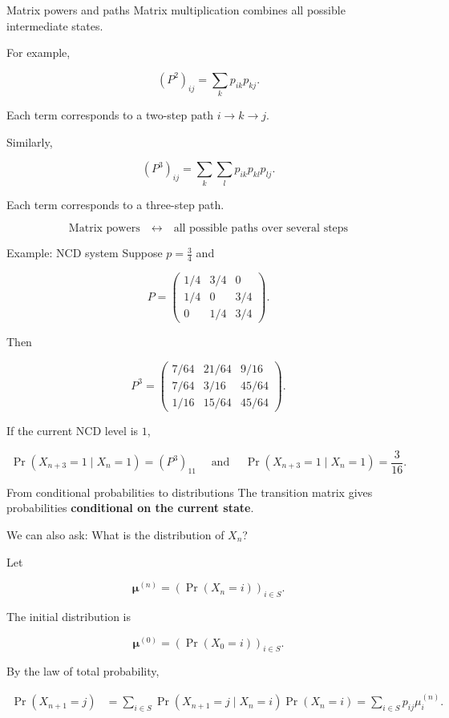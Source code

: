 \documentclass[
  ignorenonframetext,
  aspectratio=169,
]{beamer}
\begin{document}
\begin{frame}{Matrix powers and paths}
\protect{}\label{matrix-powers-and-paths}
Matrix multiplication combines all possible intermediate states.

For example,

\[
(P^2)_{ij}
=\sum_k p_{ik}p_{kj}.
\]

Each term corresponds to a two-step path
\(i\longrightarrow k\longrightarrow j.\)

Similarly,

\[
(P^3)_{ij}
=\sum_{k}\sum_l
p_{ik}p_{kl}p_{lj}.
\]

Each term corresponds to a three-step path.

\[
\boxed{
\text{Matrix powers}
\quad\longleftrightarrow\quad
\text{all possible paths over several steps}
}
\]
\end{frame}

\begin{frame}{Example: NCD system}
\protect{}\label{example-ncd-system-1}
Suppose \(p=\frac34\) and

\[
P=
\begin{pmatrix}
1/4&3/4&0\\
1/4&0&3/4\\
0&1/4&3/4
\end{pmatrix}.
\]

Then

\[
P^3=
\begin{pmatrix}
7/64&21/64&9/16\\
7/64&3/16&45/64\\
1/16&15/64&45/64
\end{pmatrix}.
\]

If the current NCD level is \(1\),

\[
\Pr(X_{n+3}=1\mid X_n=1)
=(P^3)_{11} \quad \text{ and } \quad \boxed{
\Pr(X_{n+3}=1\mid X_n=1)
=\frac{3}{16}.
}
\]
\end{frame}

\begin{frame}{From conditional probabilities to distributions}
\protect{}\label{from-conditional-probabilities-to-distributions}
The transition matrix gives probabilities \textbf{conditional on the
current state}.

We can also ask: What is the distribution of \(X_n\)?

Let

\[
\boldsymbol{\mu}^{(n)}
=\left(
\Pr(X_n=i)
\right)_{i\in S}.
\]

The initial distribution is

\[
\boldsymbol{\mu}^{(0)}
=\left(
\Pr(X_0=i)
\right)_{i\in S}.
\]

By the law of total probability,

\[
\begin{aligned}
\Pr(X_{n+1}=j)
&=
\sum_{i\in S}
\Pr(X_{n+1}=j\mid X_n=i)
\Pr(X_n=i) =
\sum_{i\in S}
p_{ij}\mu_i^{(n)}.
\end{aligned}
\]
\end{frame}
\end{document}
